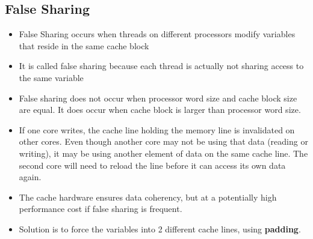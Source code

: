 \documentclass{article}
\begin{document}
\subsection{False Sharing}
\begin{itemize}
    \item False Sharing occurs when threads on different processors modify variables that reside in the same cache block 
    
    \item It is called false sharing because each thread is actually not sharing access to the same variable
    
    \item False sharing does not occur when processor word size and cache block size are equal. It does occur when cache block is larger than processor word size. 
    
    \item If one core writes, the cache line holding the memory line is invalidated on other cores. Even though another core may not be using that data (reading or writing), it may be using another element of data on the same cache line. The second core will need to reload the line before it can access its own data again.
    
    \item The cache hardware ensures data coherency, but at a potentially high performance cost if false sharing is frequent. 
    
    \item Solution is to force the variables into 2 different cache lines, using \textbf{padding}. 
\end{itemize}
\end{document}
